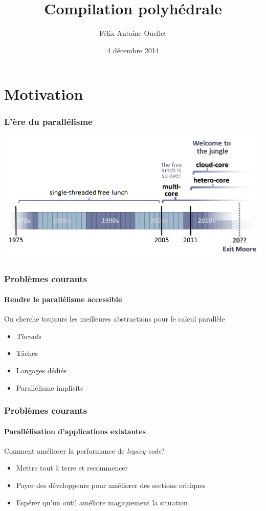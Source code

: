 \documentclass{beamer}
\author[Félix-Antoine Ouellet]{Félix-Antoine Ouellet}
\title[PolyOpt\hspace{2em}\insertframenumber/\inserttotalframenumber]{Compilation polyhédrale}
\institute{Université de Sherbrooke}
\date{4 décembre 2014}
\begin{document}
\begin{frame}
\titlepage %
\end{frame}

\begin{frame}
\tableofcontents[hideallsubsections]
\end{frame}

\section{Motivation}
\begin{frame}
\frametitle{L'ère du parallélisme}
\begin{center}
\colorbox{white}{\includegraphics[scale=0.48]{parallel.png}}
\end{center}
\end{frame}

\begin{frame}
\frametitle{Problèmes courants}
\framesubtitle{Rendre le parallélisme accessible}
On cherche toujours les meilleures abstractions pour le calcul parallèle
\begin{itemize}
\item \textit{Threads}
\item Tâches
\item Langages dédiés
\item Parallélisme implicite
\end{itemize}
\end{frame}

\begin{frame}
\frametitle{Problèmes courants}
\framesubtitle{Parallélisation d'applications existantes}
Comment améliorer la performance de \textit{legacy code}?
\begin{itemize}
\item Mettre tout à terre et recommencer
\item Payer des développeurs pour améliorer des sections critiques
\item Espérer qu'un outil améliore magiquement la situation
\end{itemize}
\end{frame}
\end{document}

